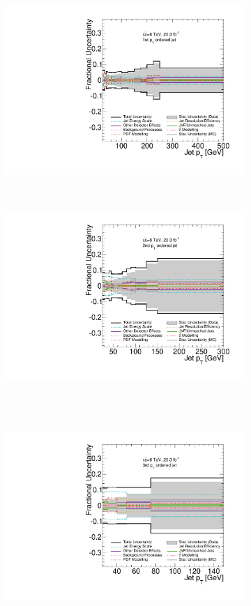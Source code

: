 \begin{figure}
\begin{subfigure}[]{0.45\textwidth}
\includegraphics[width=\textwidth]{fig/CombSystPlots/Jet0.pdf}
\end{subfigure}
~
\begin{subfigure}[]{0.45\textwidth}
\includegraphics[width=\textwidth]{fig/CombSystPlots/Jet1.pdf}
\end{subfigure} \\
~
\begin{subfigure}[]{0.45\textwidth}
\includegraphics[width=\textwidth]{fig/CombSystPlots/Jet2.pdf}

\end{subfigure}
\end{figure}

